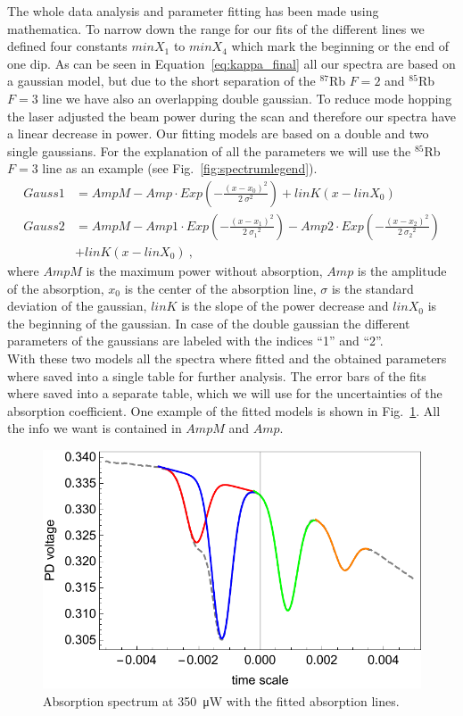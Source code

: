 The whole data analysis and parameter fitting has been made using mathematica.
To narrow down the range for our fits of the different lines we defined four
constants \(minX_1\) to \(minX_4\) which mark the beginning or the end of one dip. 
As can be seen in Equation~\ref{eq:kappa_final} all our spectra are based on a 
gaussian model, but due to the short separation of the \(^{87}\)Rb \(F=2\) and 
\(^{85}\)Rb \(F=3\) line we have also an overlapping double gaussian. To reduce 
mode hopping the laser adjusted the beam power during the scan and therefore our 
spectra have a linear decrease in power. Our fitting models are based on a double 
and two single gaussians. For the explanation of all the parameters we will use 
the \(^{85}\)Rb \(F=3\) line as an example (see Fig.~\ref{fig:spectrumlegend}).
\begin{align}
    Gauss1 &= AmpM-Amp\cdot Exp\left(-\frac{{(x-x_0)}^2}{2~\sigma^2} \right) +
                linK(x-linX_0)  \\
    Gauss2 &= AmpM-Amp1\cdot Exp\left(-\frac{{(x-x_1)}^2}{2~{\sigma_1}^2} \right)-
                  Amp2\cdot Exp\left(-\frac{{(x-x_2)}^2}{2~{\sigma_2}^2} \right) \nonumber \\
                  &+ linK(x-linX_0)~,
\end{align}
where \(AmpM\) is the maximum power without absorption, \(Amp\) is the amplitude 
of the absorption, \(x_0\) is the center of the absorption line, \(\sigma \) is 
the standard deviation of the gaussian, \(linK\) is the slope of the power 
decrease and \(linX_0\) is the beginning of the gaussian. In case of the double 
gaussian the different parameters of the gaussians are labeled with the indices 
``1'' and ``2''.\\
With these two models all the spectra where fitted and the obtained parameters 
where saved into a single table for further analysis. The error bars of the
fits where saved into a separate table, which we will use for the uncertainties
of the absorption coefficient. One example of the fitted models is shown 
in Fig.~\ref{fig:fitplot}. All the info we want is contained in \(AmpM\) and \(Amp\).
\begin{figure}[H]
    \centering
    \includegraphics[width=.8\textwidth]{fitplot}
    \caption{\label{fig:fitplot} Absorption spectrum at \SI{350}{\micro\watt}
    with the fitted absorption lines.}
\end{figure}

